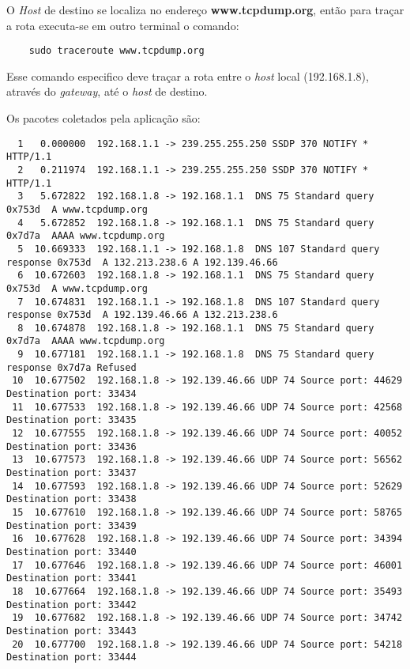 \documentclass[a4paper]{report} %
\begin{document}
	O \textit{Host} de destino se localiza no endereço \textbf{www.tcpdump.org}, então para traçar a rota executa-se em outro terminal o comando:

\begin{lstlisting}
	sudo traceroute www.tcpdump.org
\end{lstlisting}

	Esse comando especifico deve traçar a rota entre o \textit{host} local (192.168.1.8), através do \textit{gateway}, até o \textit{host} de destino.

Os pacotes coletados pela aplicação são:

\begin{lstlisting}
  1   0.000000  192.168.1.1 -> 239.255.255.250 SSDP 370 NOTIFY * HTTP/1.1
  2   0.211974  192.168.1.1 -> 239.255.255.250 SSDP 370 NOTIFY * HTTP/1.1
  3   5.672822  192.168.1.8 -> 192.168.1.1  DNS 75 Standard query 0x753d  A www.tcpdump.org
  4   5.672852  192.168.1.8 -> 192.168.1.1  DNS 75 Standard query 0x7d7a  AAAA www.tcpdump.org
  5  10.669333  192.168.1.1 -> 192.168.1.8  DNS 107 Standard query response 0x753d  A 132.213.238.6 A 192.139.46.66
  6  10.672603  192.168.1.8 -> 192.168.1.1  DNS 75 Standard query 0x753d  A www.tcpdump.org
  7  10.674831  192.168.1.1 -> 192.168.1.8  DNS 107 Standard query response 0x753d  A 192.139.46.66 A 132.213.238.6
  8  10.674878  192.168.1.8 -> 192.168.1.1  DNS 75 Standard query 0x7d7a  AAAA www.tcpdump.org
  9  10.677181  192.168.1.1 -> 192.168.1.8  DNS 75 Standard query response 0x7d7a Refused
 10  10.677502  192.168.1.8 -> 192.139.46.66 UDP 74 Source port: 44629  Destination port: 33434
 11  10.677533  192.168.1.8 -> 192.139.46.66 UDP 74 Source port: 42568  Destination port: 33435
 12  10.677555  192.168.1.8 -> 192.139.46.66 UDP 74 Source port: 40052  Destination port: 33436
 13  10.677573  192.168.1.8 -> 192.139.46.66 UDP 74 Source port: 56562  Destination port: 33437
 14  10.677593  192.168.1.8 -> 192.139.46.66 UDP 74 Source port: 52629  Destination port: 33438
 15  10.677610  192.168.1.8 -> 192.139.46.66 UDP 74 Source port: 58765  Destination port: 33439
 16  10.677628  192.168.1.8 -> 192.139.46.66 UDP 74 Source port: 34394  Destination port: 33440
 17  10.677646  192.168.1.8 -> 192.139.46.66 UDP 74 Source port: 46001  Destination port: 33441
 18  10.677664  192.168.1.8 -> 192.139.46.66 UDP 74 Source port: 35493  Destination port: 33442
 19  10.677682  192.168.1.8 -> 192.139.46.66 UDP 74 Source port: 34742  Destination port: 33443
 20  10.677700  192.168.1.8 -> 192.139.46.66 UDP 74 Source port: 54218  Destination port: 33444

\end{lstlisting}
\end{document}
